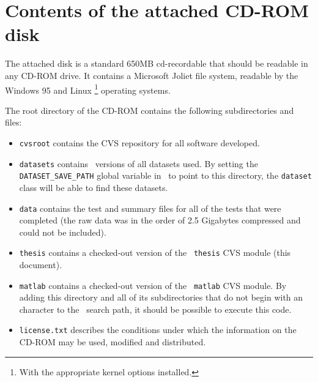 
\chapter{Contents of the attached CD-ROM disk}
\label{appendix:cdrom}

The attached disk is a standard 650MB cd-recordable that should be
readable in any CD-ROM drive.  It contains a Microsoft Joliet file
system, readable by the Windows 95 and Linux%
\footnote{With the appropriate kernel options installed.}
operating systems.

The root directory of the CD-ROM contains the following subdirectories
and files:
%
\begin{itemize}
\item	{\tt cvsroot} contains the CVS repository for all software
	developed.
\item	{\tt datasets} contains \MATLAB\ versions of all datasets
	used.  By setting the {\tt DATASET_SAVE_PATH} global variable
	in \MATLAB\ to point to this directory, the {\tt dataset}
	class will be able to find these datasets.
\item	{\tt data} contains the test and summary files for all of the
	tests that were completed (the raw data was in the order of
	2.5 Gigabytes compressed and could not be included).
\item	{\tt thesis} contains a checked-out version of the {\tt
	thesis} CVS module (this document).
\item	{\tt matlab} contains a checked-out version of the {\tt
	matlab} CVS module.  By adding this directory and all of its
	subdirectories that do not begin with an \@ character to the
	\MATLAB\ search path, it should be possible to execute this
	code.
\item	{\tt license.txt} describes the conditions under which the
	information on the CD-ROM may be used, modified and
	distributed.
\end{itemize}
